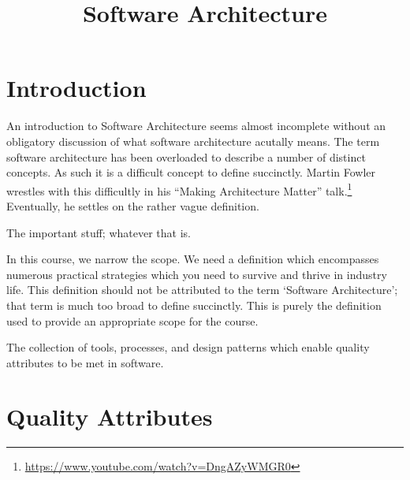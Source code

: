 \title{Software Architecture}

\maketitle

\section{Introduction}
An introduction to Software Architecture seems almost incomplete without an obligatory
discussion of what software architecture acutally means.
The term software architecture has been overloaded to describe a number of distinct concepts.
As such it is a difficult concept to define succinctly.
Martin Fowler wrestles with this difficultly in his ``Making Architecture Matter'' talk.\footnote{\url{https://www.youtube.com/watch?v=DngAZyWMGR0}}
Eventually, he settles on the rather vague definition.

\begin{definition}
The important stuff; whatever that is.
\end{definition}

In this course, we narrow the scope.
We need a definition which encompasses numerous practical strategies which you need to survive and thrive in industry life.
This definition should not be attributed to the term `Software Architecture'; that term is much too broad to define succinctly.
This is purely the definition used to provide an appropriate scope for the course.

\begin{definition}
The collection of tools, processes, and design patterns which enable quality attributes to be met in software.
\end{definition}

\section{Quality Attributes}
